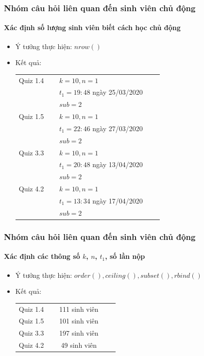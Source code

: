 \documentclass[english,10pt,table]{beamer}
\begin{document}
\frame
{
\frametitle{Nhóm câu hỏi liên quan đến sinh viên chủ động}
\framesubtitle{Xác định số lượng sinh viên biết cách học chủ động}
\begin{itemize}
    \item Ý tưởng thực hiện: $nrow()$
    \item Kết quả:\\
    \begin{center}
        \begin{tabular}{l l l c c} 
             Quiz 1.4 & $\;$ & $k= 10, n = 1$\\
             & & $t_1 = 19:48$ ngày 25/03/2020\\
             & & $sub = 2$\\
             Quiz 1.5 & $\;$ & $k= 10, n = 1$\\
             & & $t_1 = 22:46$ ngày 27/03/2020\\
             & & $sub = 2$\\
             Quiz 3.3 & $\;$ & $k= 10, n = 1$\\
             & & $t_1 = 20:48$ ngày 13/04/2020\\
             & & $sub = 2$\\
             Quiz 4.2 & $\;$ & $k= 10, n = 1$\\
             & & $t_1 = 13:34$ ngày 17/04/2020\\
             & & $sub = 2$
        \end{tabular}
    \end{center}
\end{itemize}
}

\frame
{
\frametitle{Nhóm câu hỏi liên quan đến sinh viên chủ động}
\framesubtitle{Xác định các thông số $k$, $n$, $t_1$, số lần nộp}
\begin{itemize}
    \item Ý tưởng thực hiện: $order(), ceiling(), subset(), rbind()$
    \item Kết quả:\\
    \begin{center}
        \begin{tabular}{l l c c c} 
             Quiz 1.4 & $\;$ & 111 sinh viên\\
             Quiz 1.5 & $\;$ & 101 sinh viên\\
             Quiz 3.3 & $\;$ & 197 sinh viên\\
             Quiz 4.2 & $\;$ & 49 sinh viên
        \end{tabular}
    \end{center}
\end{itemize}
}
\end{document}

